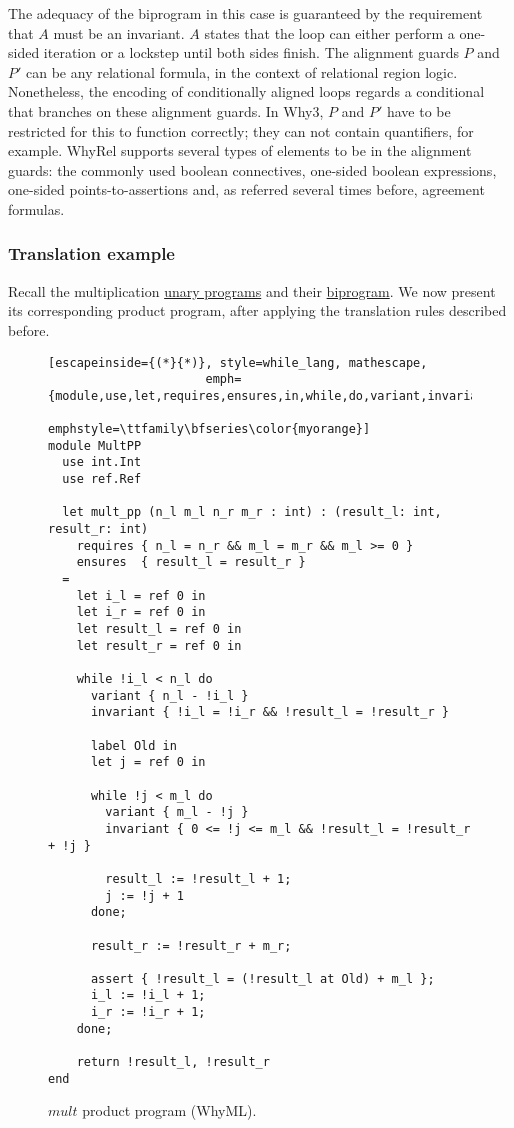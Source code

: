 The adequacy of the biprogram in this case is guaranteed by the requirement that $A$ must be an invariant.
$A$ states that the loop can either perform a one-sided iteration or a lockstep until both sides finish.
The alignment guards $P$ and $P'$ can be any relational formula, in the context of relational region logic.
Nonetheless, the encoding of conditionally aligned loops regards a conditional that branches on these alignment guards.
In Why3, $P$ and $P'$ have to be restricted for this to function correctly; they can not contain quantifiers, for example.
WhyRel supports several types of elements to be in the alignment guards: the commonly used boolean connectives, one-sided boolean expressions, one-sided points-to-assertions and, as referred several times before, agreement formulas.


\subsubsection{Translation example}
\label{subsubsec:whyrel_translation_example}

Recall the multiplication \hyperref[fig:mult_source_programs]{unary programs} and their \hyperref[fig:mult_biprogram]{biprogram}.
We now present its corresponding product program, after applying the translation rules described before.

\begin{figure}[h]
  \centering
  \noindent
  \begin{lstlisting}[escapeinside={(*}{*)}, style=while_lang, mathescape,
                      emph={module,use,let,requires,ensures,in,while,do,variant,invariant,done,return,label,end,assert},
                      emphstyle=\ttfamily\bfseries\color{myorange}]
module MultPP
  use int.Int
  use ref.Ref

  let mult_pp (n_l m_l n_r m_r : int) : (result_l: int, result_r: int)
    requires { n_l = n_r && m_l = m_r && m_l >= 0 }
    ensures  { result_l = result_r }
  =
    let i_l = ref 0 in
    let i_r = ref 0 in
    let result_l = ref 0 in
    let result_r = ref 0 in

    while !i_l < n_l do
      variant { n_l - !i_l }
      invariant { !i_l = !i_r && !result_l = !result_r }

      label Old in
      let j = ref 0 in
      
      while !j < m_l do
        variant { m_l - !j }
        invariant { 0 <= !j <= m_l && !result_l = !result_r + !j }

        result_l := !result_l + 1;
        j := !j + 1
      done;

      result_r := !result_r + m_r;

      assert { !result_l = (!result_l at Old) + m_l };
      i_l := !i_l + 1;
      i_r := !i_r + 1;
    done;
    
    return !result_l, !result_r
end
  \end{lstlisting}
  \caption{$mult$ product program (WhyML).}
  \label{fig:translation_ex}
\end{figure}

